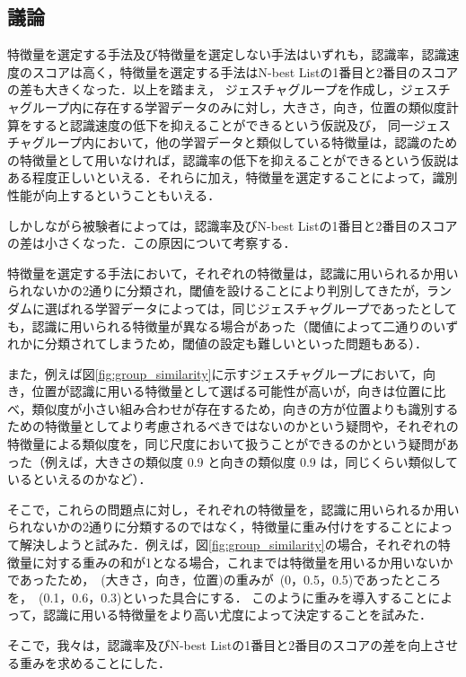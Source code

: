 \newpage
\subsection{議論}

特徴量を選定する手法及び特徴量を選定しない手法はいずれも，認識率，認識速度のスコアは高く，特徴量を選定する手法はN-best Listの1番目と2番目のスコアの差も大きくなった．以上を踏まえ，
ジェスチャグループを作成し，ジェスチャグループ内に存在する学習データのみに対し，大きさ，向き，位置の類似度計算をすると認識速度の低下を抑えることができるという仮説及び，
同一ジェスチャグループ内において，他の学習データと類似している特徴量は，認識のための特徴量として用いなければ，認識率の低下を抑えることができるという仮説はある程度正しいといえる．それらに加え，特徴量を選定することによって，識別性能が向上するということもいえる．

しかしながら被験者によっては，認識率及びN-best Listの1番目と2番目のスコアの差は小さくなった．この原因について考察する．

特徴量を選定する手法において，それぞれの特徴量は，認識に用いられるか用いられないかの2通りに分類され，閾値を設けることにより判別してきたが，ランダムに選ばれる学習データによっては，同じジェスチャグループであったとしても，認識に用いられる特徴量が異なる場合があった（閾値によって二通りのいずれかに分類されてしまうため，閾値の設定も難しいといった問題もある）．

また，例えば図\ref{fig:group_similarity}に示すジェスチャグループにおいて，向き，位置が認識に用いる特徴量として選ばる可能性が高いが，向きは位置に比べ，類似度が小さい組み合わせが存在するため，向きの方が位置よりも識別するための特徴量としてより考慮されるべきではないのかという疑問や，それぞれの特徴量による類似度を，同じ尺度において扱うことができるのかという疑問があった（例えば，大きさの類似度 0.9 と向きの類似度 0.9 は，同じくらい類似しているといえるのかなど）．

そこで，これらの問題点に対し，それぞれの特徴量を，認識に用いられるか用いられないかの2通りに分類するのではなく，特徴量に重み付けをすることによって解決しようと試みた．例えば，図\ref{fig:group_similarity}の場合，それぞれの特徴量に対する重みの和が1となる場合，これまでは特徴量を用いるか用いないかであったため，~(大きさ，向き，位置)の重みが~(0，0.5，0.5)であったところを，~(0.1，0.6，0.3)といった具合にする．
このように重みを導入することによって，認識に用いる特徴量をより高い尤度によって決定することを試みた．

そこで，我々は，認識率及びN-best Listの1番目と2番目のスコアの差を向上させる重みを求めることにした．

